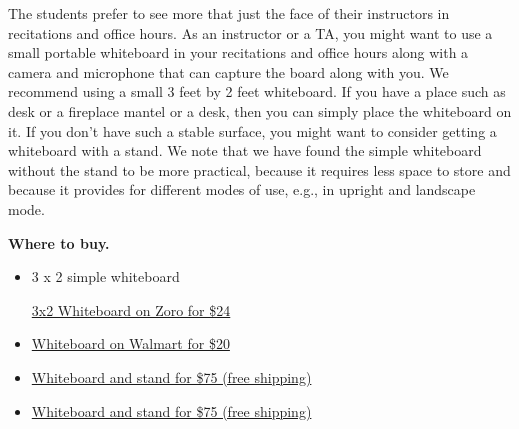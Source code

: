 \begin{gram}[Whiteboards]

The students prefer to see more that just the face of their
instructors in recitations and office hours. 
%
As an instructor or a TA, you might want to use a small portable
whiteboard in your recitations and office hours along with a camera
and microphone that can capture the board along with you. 
%
We recommend using a small 3 feet by 2 feet whiteboard.  
%
If you have a place such as desk or a fireplace mantel or a desk, then
you can simply place the whiteboard on it.  If you don't have such a
stable surface, you might want to consider getting a whiteboard with a
stand.
%
We note that we have found the simple whiteboard without the stand to
be more practical, because it requires less space to store and because
it provides for different modes of use, e.g., in upright and landscape
mode.


\textbf{Where to buy.}

\begin{itemize}
\item
3 x 2 simple whiteboard

\href{https://www.zoro.com/zoro-select-dry-erase-board-36-w-silver-1nup9/i/G1291367/}{3x2
  Whiteboard on Zoro for \$24}

\item
\href{https://www.walmart.com/ip/Universal-Melamine-Dry-Erase-Board-36-x-24-Satin-Finished-Aluminum-Frame/21794195?wmlspartner=wlpa&selectedSellerId=1194&&adid=22222222227015737388&wl0=&wl1=g&wl2=c&wl3=52438033391&wl4=pla-83993817911&wl5=1025202&wl6=&wl7=&wl8=&wl9=pla&wl10=112550058&wl11=online&wl12=21794195&veh=sem&gclid=Cj0KCQjwhIP6BRCMARIsALu9Lfmsq_QIRmgF0rbJxUlILrtcELAuduVKI6z9GdzLxIafjLXdwYfXkmMaAoogEALw_wcB}
{Whiteboard on Walmart for \$20}

\item 
\href{https://www.shoplet.com/Universal-Adjustable-White-Board-Easel/UNV43033/spdv?pt=rk_frg_pla&gclid=Cj0KCQjwvvj5BRDkARIsAGD9vlIAZ8S65M9rY3gJkgpDk6kzZXPSJ-ljV9qVFojSsax5k88zKntEyP0aAuOHEALw_wcB}
{Whiteboard and stand for \$75 (free shipping)}

\item
\href{https://www.officesupply.com/office-supplies/boards-easels/boards/easel-boards/universal-erase-easel-board-easel-height-board-white-silver/p192673.html?ref=pla&utm_source=google&utm_medium=cpc&adpos=&scid=scplp192673&sc_intid=192673&gclid=Cj0KCQjwhIP6BRCMARIsALu9LfmKVfLex71VAT_aU8G5FnQ7ULqQ4m__EUZgIeTURj1PjGfqEOdedvcaAux8EALw_wcB}
{Whiteboard and stand for \$75 (free shipping)}

\end{itemize}

\end{gram}

